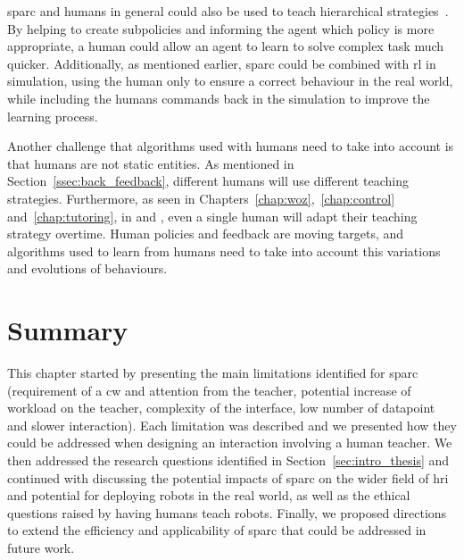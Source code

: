 \gls{sparc} and humans in general could also be used to teach hierarchical strategies~\citep{botvinick2012hierarchical}. By helping to create subpolicies and informing the agent which policy is more appropriate, a human could allow an agent to learn to solve complex task much quicker. Additionally, as mentioned earlier, \gls{sparc} could be combined with \gls{rl} in simulation, using the human only to ensure a correct behaviour in the real world, while including the humans commands back in the simulation to improve the learning process.

Another challenge that algorithms used with humans need to take into account is that humans are not static entities. As mentioned in Section~\ref{ssec:back_feedback}, different humans will use different teaching strategies. Furthermore, as seen in Chapters~\ref{chap:woz},~\ref{chap:control} and~\ref{chap:tutoring}, in \cite{thomaz2008teachable} and \cite{macglashan2017interactive}, even a single human will adapt their teaching strategy overtime. Human policies and feedback are moving targets, and algorithms used to learn from humans need to take into account this variations and evolutions of behaviours.

\section{Summary} \label{sec:disc_summary}


This chapter started by presenting the main limitations identified for \gls{sparc} (requirement of a \gls{cw} and attention from the teacher, potential increase of workload on the teacher, complexity of the interface, low number of datapoint and slower interaction). Each limitation was described and we presented how they could be addressed when designing an interaction involving a human teacher. We then addressed the research questions identified in Section~\ref{sec:intro_thesis} and continued with discussing the potential impacts of \gls{sparc} on the wider field of \gls{hri} and potential for deploying robots in the real world, as well as the ethical questions raised by having humans teach robots. Finally, we proposed directions to extend the efficiency and applicability of \gls{sparc} that could be addressed in future work.
